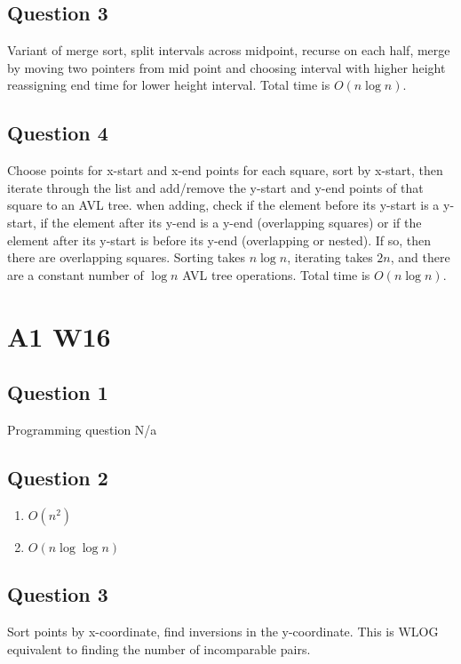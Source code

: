 \documentclass[11pt]{article}
\begin{document}
\subsection{Question 3}

Variant of merge sort, split intervals across midpoint, recurse on each half, merge by moving two pointers from mid point and choosing interval with higher height reassigning end time for lower height interval. Total time is $O(n \log n)$.

\subsection{Question 4}

Choose points for x-start and x-end points for each square, sort by x-start, then iterate through the list and add/remove the y-start and y-end points of that square to an AVL tree. when adding, check if the element before its y-start is a y-start, if the element after its y-end is a y-end (overlapping squares) or if the element after its y-start is before its y-end (overlapping or nested). If so, then there are overlapping squares. Sorting takes $n \log n$, iterating takes $2n$, and there are a constant number of $\log n$ AVL tree operations. Total time is $O(n \log n)$.

\section{A1 W16}

\subsection{Question 1}

Programming question N/a

\subsection{Question 2}

\begin{enumerate}
    \item $O(n^2)$
    \item $O(n \log \log n)$
\end{enumerate}

\subsection{Question 3}

Sort points by x-coordinate, find inversions in the y-coordinate. This is WLOG equivalent to finding the number of incomparable pairs.
\end{document}
